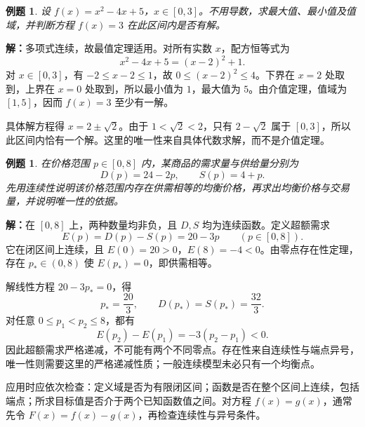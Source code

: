 \documentclass[UTF8,fontset=fandol,11pt]{ctexart}
\newtheorem{example}[definition]{例题}
\begin{document}
\begin{example}
设 $f(x)=x^2-4x+5$，$x\in[0,3]$。不用导数，求最大值、最小值及值域，并判断方程 $f(x)=3$ 在此区间内是否有解。
\end{example}
\par\noindent\textbf{解：}多项式连续，故最值定理适用。对所有实数 $x$，配方恒等式为
\[
x^2-4x+5=(x-2)^2+1.
\]
对 $x\in[0,3]$，有 $-2\leq x-2\leq1$，故 $0\leq(x-2)^2\leq4$。下界在 $x=2$ 处取到，上界在 $x=0$ 处取到，所以最小值为 $1$，最大值为 $5$。由介值定理，值域为 $[1,5]$，因而 $f(x)=3$ 至少有一解。

具体解方程得 $x=2\pm\sqrt{2}$。由于 $1<\sqrt{2}<2$，只有 $2-\sqrt{2}$ 属于 $[0,3]$，所以此区间内恰有一个解。这里的唯一性来自具体代数求解，而不是介值定理。\par
\begin{example}
在价格范围 $p\in[0,8]$ 内，某商品的需求量与供给量分别为
\[
D(p)=24-2p,\qquad S(p)=4+p.
\]
先用连续性说明该价格范围内存在供需相等的均衡价格，再求出均衡价格与交易量，并说明唯一性的依据。
\end{example}
\par\noindent\textbf{解：}在 $[0,8]$ 上，两种数量均非负，且 $D,S$ 均为连续函数。定义超额需求
\[
E(p)=D(p)-S(p)=20-3p\qquad(p\in[0,8]).
\]
它在闭区间上连续，且 $E(0)=20>0$，$E(8)=-4<0$。由零点存在性定理，存在 $p_*\in(0,8)$ 使 $E(p_*)=0$，即供需相等。

解线性方程 $20-3p_*=0$，得
\[
p_*=\frac{20}{3},\qquad D(p_*)=S(p_*)=\frac{32}{3}.
\]
对任意 $0\leq p_1<p_2\leq8$，都有
\[
E(p_2)-E(p_1)=-3(p_2-p_1)<0.
\]
因此超额需求严格递减，不可能有两个不同零点。存在性来自连续性与端点异号，唯一性则需要这里的严格递减性质；一般连续模型未必只有一个均衡点。\par
应用时应依次检查：定义域是否为有限闭区间；函数是否在整个区间上连续，包括端点；所求目标值是否介于两个已知函数值之间。对方程 $f(x)=g(x)$，通常先令 $F(x)=f(x)-g(x)$，再检查连续性与异号条件。
\end{document}
